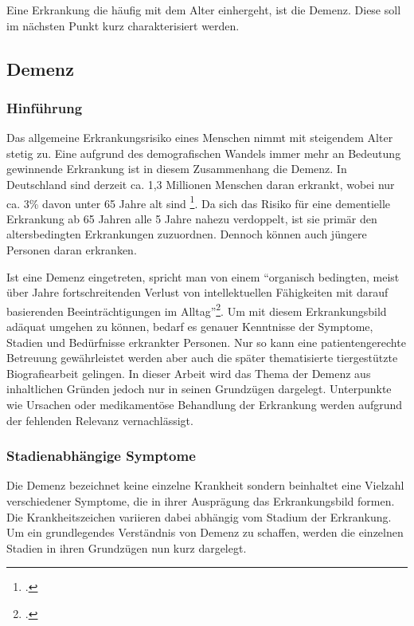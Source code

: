 Eine Erkrankung die häufig mit dem Alter einhergeht, ist die Demenz. Diese soll im nächsten Punkt kurz charakterisiert werden.

\subsection{Demenz}
\label{sec:k2.2_Demenz}

\subsubsection{Hinführung}
\label{sec:k2.2.1_Hinfuehrung}

Das allgemeine Erkrankungsrisiko eines Menschen nimmt mit steigendem Alter stetig zu. Eine aufgrund des demografischen Wandels immer mehr an Bedeutung gewinnende Erkrankung ist in diesem Zusammenhang die Demenz. In Deutschland sind derzeit ca. 1,3 Millionen Menschen daran erkrankt, wobei nur ca. 3\% davon unter 65 Jahre alt sind \footcite[vgl.][9]{Schwarz2009}. Da sich das Risiko für eine dementielle Erkrankung ab 65 Jahren alle 5 Jahre nahezu verdoppelt, ist sie primär den altersbedingten Erkrankungen zuzuordnen. Dennoch können auch jüngere Personen daran erkranken. 

Ist eine Demenz eingetreten, spricht man von einem "`organisch bedingten, meist über Jahre fortschreitenden Verlust von intellektuellen Fähigkeiten mit darauf basierenden Beeinträchtigungen im Alltag"'\footcite[11]{o.A.2013}. Um mit diesem Erkrankungsbild adäquat umgehen zu können, bedarf es genauer Kenntnisse der Symptome, Stadien und Bedürfnisse erkrankter Personen. Nur so kann eine patientengerechte Betreuung gewährleistet werden aber auch die später thematisierte tiergestützte Biografiearbeit gelingen. In dieser Arbeit wird das Thema der Demenz aus inhaltlichen Gründen jedoch nur in seinen Grundzügen dargelegt. Unterpunkte wie Ursachen oder medikamentöse Behandlung der Erkrankung werden aufgrund der fehlenden Relevanz vernachlässigt.

\subsubsection{Stadienabhängige Symptome}
\label{sec:k2.2.2_StadienabhängigeSymptome}

Die Demenz bezeichnet keine einzelne Krankheit sondern beinhaltet eine Vielzahl verschiedener Symptome, die in ihrer Ausprägung das Erkrankungsbild formen. Die Krankheitszeichen variieren dabei abhängig vom Stadium der Erkrankung. Um ein grundlegendes Verständnis von Demenz zu schaffen, werden die einzelnen Stadien in ihren Grundzügen nun kurz dargelegt.

